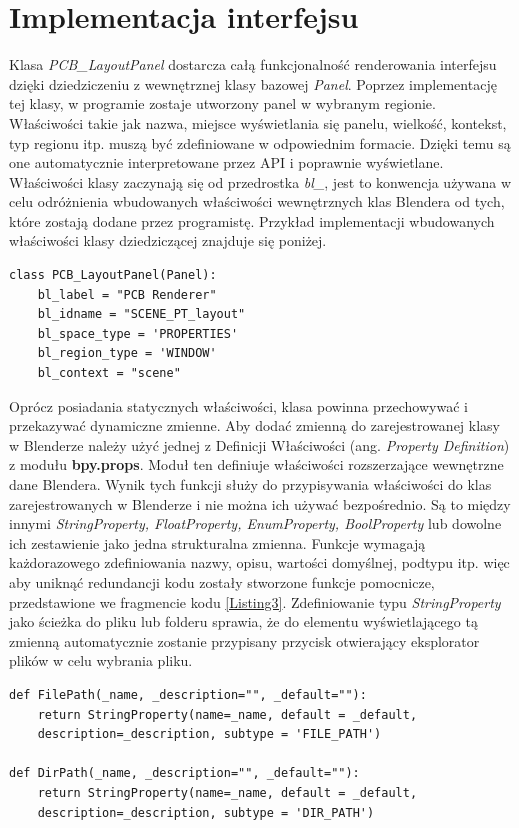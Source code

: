 \documentclass{xmgr}
\begin{document}
\section {Implementacja interfejsu}

Klasa \emph{PCB\_LayoutPanel} dostarcza całą funkcjonalność renderowania interfejsu dzięki dziedziczeniu z wewnętrznej klasy bazowej \emph{Panel}. Poprzez implementację tej klasy, w programie zostaje utworzony panel w wybranym regionie. Właściwości takie jak nazwa, miejsce wyświetlania się panelu, wielkość, kontekst, typ regionu itp. muszą być zdefiniowane w odpowiednim formacie. Dzięki temu są one automatycznie interpretowane przez API i poprawnie wyświetlane. Właściwości klasy zaczynają się od przedrostka \emph{bl\_}, jest to konwencja używana w celu odróżnienia wbudowanych właściwości wewnętrznych klas Blendera od tych, które zostają dodane przez programistę. Przykład implementacji wbudowanych właściwości klasy dziedziczącej znajduje się poniżej.
\newpage
{}
\begin{lstlisting}
class PCB_LayoutPanel(Panel):
	bl_label = "PCB Renderer"
	bl_idname = "SCENE_PT_layout"
	bl_space_type = 'PROPERTIES'
	bl_region_type = 'WINDOW'
	bl_context = "scene"
\end{lstlisting}
\vspace{5mm}

Oprócz posiadania statycznych właściwości, klasa powinna przechowywać i przekazywać dynamiczne zmienne. Aby dodać zmienną do zarejestrowanej klasy w Blenderze należy użyć jednej z Definicji Właściwości (ang. \emph{Property Definition}) z modułu \textbf{bpy.props}. Moduł ten definiuje właściwości rozszerzające wewnętrzne dane Blendera. Wynik tych funkcji służy do przypisywania właściwości do klas zarejestrowanych w Blenderze i nie można ich używać bezpośrednio. Są to między innymi \emph{StringProperty, FloatProperty, EnumProperty, BoolProperty} lub dowolne ich zestawienie jako jedna strukturalna zmienna. Funkcje wymagają każdorazowego zdefiniowania nazwy, opisu, wartości domyślnej, podtypu itp. więc aby uniknąć redundancji kodu zostały stworzone funkcje pomocnicze, przedstawione we fragmencie kodu \ref{Listing3}. Zdefiniowanie typu \emph{StringProperty} jako ścieżka do pliku lub folderu sprawia, że do elementu wyświetlającego tą zmienną automatycznie zostanie przypisany przycisk otwierający eksplorator plików w celu wybrania pliku.

\begin{lstlisting}
def FilePath(_name, _description="", _default=""):
	return StringProperty(name=_name, default = _default,
	description=_description, subtype = 'FILE_PATH')
    
def DirPath(_name, _description="", _default=""):
	return StringProperty(name=_name, default = _default,
	description=_description, subtype = 'DIR_PATH')
\end{lstlisting}
\end{document}

